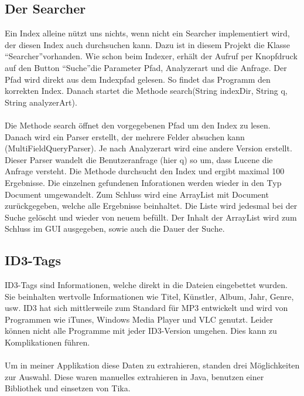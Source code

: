 \documentclass[12pt,a4paper,ngerman]{report}
\begin{document}
\subsection*{Der Searcher}
Ein Index alleine nützt uns nichts, wenn nicht ein Searcher implementiert wird, der diesen Index auch durchsuchen kann. Dazu ist in diesem Projekt die Klasse \textquotedblleft Searcher\textquotedblright vorhanden. Wie schon beim Indexer, erhält der Aufruf per Knopfdruck auf den Button \textquotedblleft Suche\textquotedblright die Parameter Pfad, Analyzerart und die Anfrage. Der Pfad wird direkt aus dem Indexpfad gelesen. So findet das Programm den korrekten Index. Danach startet die Methode search(String indexDir, String q, String analyzerArt).\\
\\
Die Methode search öffnet den vorgegebenen Pfad um den Index zu lesen. Danach wird ein Parser erstellt, der mehrere Felder absuchen kann (MultiFieldQueryParser). Je nach Analyzerart wird eine andere Version erstellt. Dieser Parser wandelt die Benutzeranfrage (hier q) so um, dass Lucene die Anfrage versteht. Die Methode durchsucht den Index und ergibt maximal 100 Ergebnisse. Die einzelnen gefundenen Inforationen werden wieder in den Typ Document umgewandelt. Zum Schluss wird eine ArrayList mit Document zurückgegeben, welche alle Ergebnisse beinhaltet. Die Liste wird jedesmal bei der Suche gelöscht und wieder von neuem befüllt. Der Inhalt der ArrayList wird zum Schluss im GUI ausgegeben, sowie auch die Dauer der Suche.
\subsection*{ID3-Tags}
ID3-Tags sind Informationen, welche direkt in die Dateien eingebettet wurden. Sie beinhalten wertvolle Informationen wie Titel, Künstler, Album, Jahr, Genre, usw. ID3 hat sich mittlerweile zum Standard für MP3 entwickelt und wird von Programmen wie iTunes, Windows Media Player und VLC genutzt. Leider können nicht alle Programme mit jeder ID3-Version umgehen. Dies kann zu Komplikationen führen.\\
\\
Um in meiner Applikation diese Daten zu extrahieren, standen drei Möglichkeiten zur Auswahl. Diese waren manuelles extrahieren in Java, benutzen einer Bibliothek und einsetzen von Tika.
\end{document}
